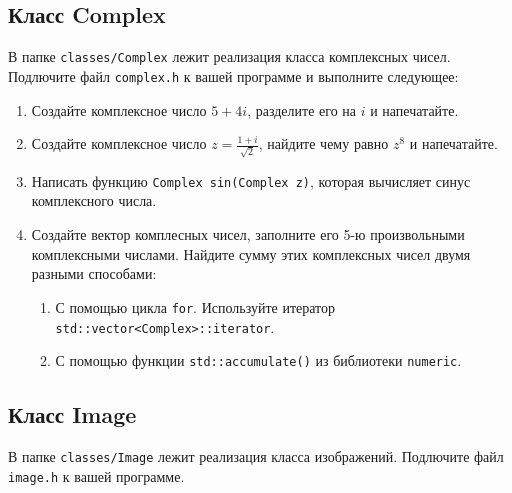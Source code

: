 \documentclass{article}
\begin{document}
\subsection*{Класс Complex}
В папке \texttt{classes/Complex} лежит реализация класса комплексных чисел. Подлючите файл \texttt{complex.h} к вашей программе и выполните следующее:
\begin{enumerate}
\item Создайте комплексное число $5+4i$, разделите его на $i$ и напечатайте.
\item Создайте комплексное число $z = \frac{1+i}{\sqrt{2}}$, найдите чему равно $z^8$ и напечатайте.
\item Написать функцию \texttt{Complex sin(Complex z)}, которая вычисляет синус комплексного числа.
\item Создайте вектор комплесных чисел, заполните его 5-ю произвольными комплексными числами. Найдите сумму этих комплексных чисел двумя разными способами:
	\begin{enumerate}
	\item С помощью цикла \texttt{for}. Используйте итератор \texttt{std::vector<Complex>::iterator}.
	\item С помощью функции \texttt{std::accumulate()} из библиотеки \texttt{numeric}.
	\end{enumerate}
\end{enumerate}
\subsection*{Класс Image}
В папке \texttt{classes/Image} лежит реализация класса изображений. Подлючите файл \texttt{image.h} к вашей программе.
\begin{figure}[H]
\end{figure}
\end{document}
